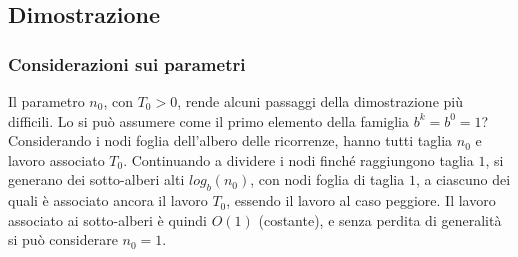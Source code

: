 \subsection{Dimostrazione}

\subsubsection{Considerazioni sui parametri}
Il parametro $n_0$, con $T_0>0$, rende alcuni passaggi della dimostrazione più difficili. Lo si può assumere come il primo elemento della famiglia $b^k=b^0=1$? Considerando i nodi foglia dell'albero delle ricorrenze, hanno tutti taglia $n_0$ e lavoro associato $T_0$. Continuando a dividere i nodi finché raggiungono taglia $1$, si generano dei sotto-alberi alti $log_b \left( n_0 \right)$, con nodi foglia di taglia $1$, a ciascuno dei quali è associato ancora il lavoro $T_0$, essendo il lavoro al caso peggiore. Il lavoro associato ai sotto-alberi è quindi $O(1)$ (costante), e senza perdita di generalità si può considerare $n_0=1$.

